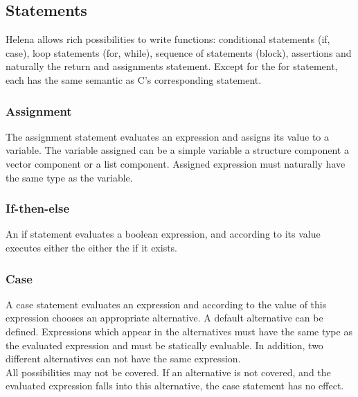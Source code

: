 \functiondef



\subsection{Statements}
Helena allows rich possibilities to write functions: conditional
statements (if, case), loop statements (for, while), sequence of
statements (block), assertions and naturally the return and
assignments statement.  Except for the for statement, each has the
same semantic as C's corresponding statement.\\

\statementdef


\subsubsection{Assignment}
The assignment statement evaluates an expression and assigns its value
to a variable.  The variable assigned can be a simple variable a
structure component a vector component or a list component.  Assigned
expression must naturally have the same type as the variable.\\

\assignmentdef


\subsubsection{If-then-else}
An if statement evaluates a boolean expression, and according to its
value executes either the  either the
 if it exists.\\

\ifdef


\subsubsection{Case}
A case statement evaluates an expression and according to the value of
this expression chooses an appropriate alternative.  A default
alternative can be defined.  Expressions which appear in the
alternatives must have the same type as the evaluated expression and
must be statically evaluable.  In addition, two different alternatives
can not have the same expression.\\
All possibilities may not be covered.  If an alternative is not
covered, and the evaluated expression falls into this alternative, the
case statement has no effect.\\

